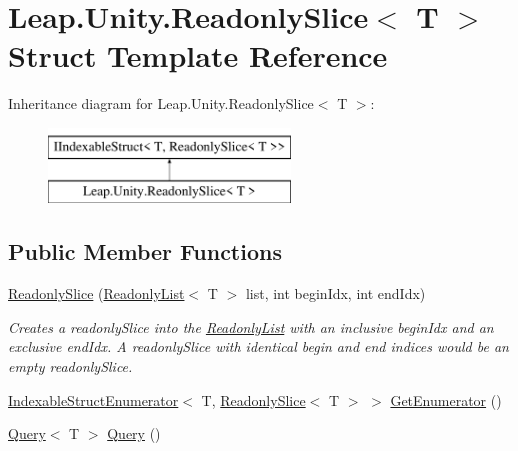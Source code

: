 \hypertarget{struct_leap_1_1_unity_1_1_readonly_slice}{}\section{Leap.\+Unity.\+Readonly\+Slice$<$ T $>$ Struct Template Reference}
\label{struct_leap_1_1_unity_1_1_readonly_slice}
Inheritance diagram for Leap.\+Unity.\+Readonly\+Slice$<$ T $>$\+:\begin{figure}[H]
\begin{center}
\leavevmode
\includegraphics[height=2.000000cm]{struct_leap_1_1_unity_1_1_readonly_slice}
\end{center}
\end{figure}
\subsection*{Public Member Functions}
\begin{DoxyCompactItemize}
\item 
\mbox{\hyperlink{struct_leap_1_1_unity_1_1_readonly_slice_a67460191081a7c77a2a715a7b61d80a1}{Readonly\+Slice}} (\mbox{\hyperlink{struct_leap_1_1_unity_1_1_readonly_list}{Readonly\+List}}$<$ T $>$ list, int begin\+Idx, int end\+Idx)
\begin{DoxyCompactList}\small\item\em Creates a readonly\+Slice into the \mbox{\hyperlink{struct_leap_1_1_unity_1_1_readonly_list}{Readonly\+List}} with an inclusive begin\+Idx and an {\itshape exclusive} end\+Idx. A readonly\+Slice with identical begin and end indices would be an empty readonly\+Slice. \end{DoxyCompactList}\item 
\mbox{\hyperlink{struct_leap_1_1_unity_1_1_indexable_struct_enumerator}{Indexable\+Struct\+Enumerator}}$<$ T, \mbox{\hyperlink{struct_leap_1_1_unity_1_1_readonly_slice}{Readonly\+Slice}}$<$ T $>$ $>$ \mbox{\hyperlink{struct_leap_1_1_unity_1_1_readonly_slice_aa0a31eee8c64bcb819fee93c017c80c1}{Get\+Enumerator}} ()
\item 
\mbox{\hyperlink{struct_leap_1_1_unity_1_1_query_1_1_query}{Query}}$<$ T $>$ \mbox{\hyperlink{struct_leap_1_1_unity_1_1_readonly_slice_af4b44e3656104f31d5673f9865d5d971}{Query}} ()
\end{DoxyCompactItemize}
